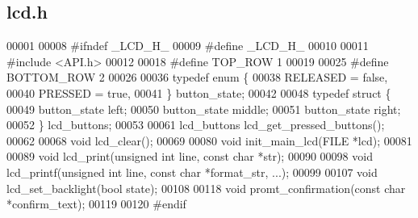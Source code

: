 \subsection{lcd.\+h}
\label{lcd_8h_source}

\begin{DoxyCode}
00001 
00008 \textcolor{preprocessor}{#ifndef \_LCD\_H\_}
00009 \textcolor{preprocessor}{#define \_LCD\_H\_}
00010 
00011 \textcolor{preprocessor}{#include <API.h>}
00012 
00018 \textcolor{preprocessor}{#define TOP\_ROW 1}
00019 
00025 \textcolor{preprocessor}{#define BOTTOM\_ROW 2}
00026 
00036 \textcolor{keyword}{typedef} \textcolor{keyword}{enum} \{
00038   RELEASED = \textcolor{keyword}{false},
00040   PRESSED = \textcolor{keyword}{true},
00041 \} button_state;
00042 
00048 \textcolor{keyword}{typedef} \textcolor{keyword}{struct }\{
00049   button_state left;
00050   button_state middle;
00051   button_state right;
00052 \} lcd_buttons;
00053 
00061 lcd_buttons lcd_get_pressed_buttons();
00062 
00068 \textcolor{keywordtype}{void} lcd_clear();
00069 
00080 \textcolor{keywordtype}{void} init_main_lcd(FILE *lcd);
00081 
00089 \textcolor{keywordtype}{void} lcd_print(\textcolor{keywordtype}{unsigned} \textcolor{keywordtype}{int} line, \textcolor{keyword}{const} \textcolor{keywordtype}{char} *str);
00090 
00098 \textcolor{keywordtype}{void} lcd_printf(\textcolor{keywordtype}{unsigned} \textcolor{keywordtype}{int} line, \textcolor{keyword}{const} \textcolor{keywordtype}{char} *format\_str, ...);
00099 
00107 \textcolor{keywordtype}{void} lcd_set_backlight(\textcolor{keywordtype}{bool} state);
00108 
00118 \textcolor{keywordtype}{void} promt_confirmation(\textcolor{keyword}{const} \textcolor{keywordtype}{char} *confirm\_text);
00119 
00120 \textcolor{preprocessor}{#endif}
\end{DoxyCode}

